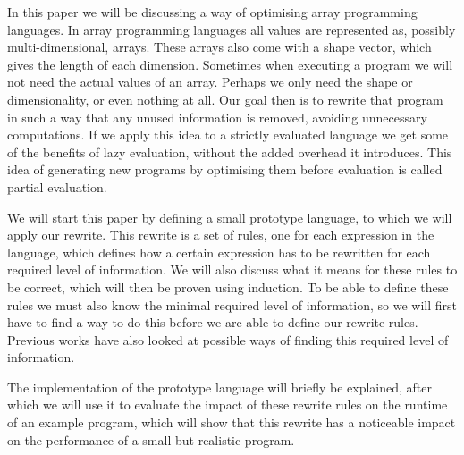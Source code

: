 \documentclass[../main.tex]{subfiles}
\begin{document}
In this paper we will be discussing a way of optimising array programming languages. In array programming languages all values are represented as, possibly multi-dimensional, arrays. These arrays also come with a shape vector, which gives the length of each dimension.
Sometimes when executing a program we will not need the actual values of an array. Perhaps we only need the shape or dimensionality, or even nothing at all. Our goal then is to rewrite that program in such a way that any unused information is removed, avoiding unnecessary computations.
If we apply this idea to a strictly evaluated language we get some of the benefits of lazy evaluation, without the added overhead it introduces.
This idea of generating new programs by optimising them before evaluation is called partial evaluation\cite{introduction-to-partial-evaluation}\cite{partial-evaluation}\cite{tensor-comprehension}.

We will start this paper by defining a small prototype language, to which we will apply our rewrite. This rewrite is a set of rules, one for each expression in the language, which defines how a certain expression has to be rewritten for each required level of information. We will also discuss what it means for these rules to be correct, which will then be proven using induction.
To be able to define these rules we must also know the minimal required level of information, so we will first have to find a way to do this before we are able to define our rewrite rules.
Previous works have also looked at possible ways of finding this required level of information\cite{binding-scope-analysis}\cite{binding-time-analysis}\cite{optimising-array-programs}.

The implementation of the prototype language will briefly be explained, after which we will use it to evaluate the impact of these rewrite rules on the runtime of an example program, which will show that this rewrite has a noticeable impact on the performance of a small but realistic program.
\end{document}
